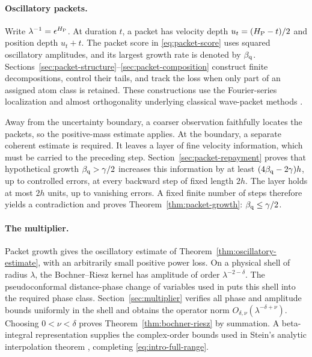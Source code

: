 \paragraph{Oscillatory packets.}
Write $\lambda^{-1}=\epsilon^{H_{\mathrm P}}$. At duration $t$, a packet has
velocity depth $u_t=(H_{\mathrm P}-t)/2$ and position depth $u_t+t$.
The packet score in \eqref{eq:packet-score} uses squared oscillatory
amplitudes, and its largest growth rate is denoted by $\beta_{\mathrm q}$.
Sections~\ref{sec:packet-structure}--\ref{sec:packet-composition}
construct finite decompositions, control their tails, and track the
loss when only part of an assigned atom class is retained. These
constructions use the Fourier-series localization and almost
orthogonality underlying classical wave-packet methods
\citep{Tao2003,GuoOhWangWuZhang2025}.

Away from the uncertainty boundary, a coarser observation faithfully
locates the packets, so the positive-mass estimate applies. At the
boundary, a separate coherent estimate is required. It leaves a layer
of fine velocity information, which must be carried to the preceding
step. Section~\ref{sec:packet-repayment} proves that hypothetical
growth $\beta_{\mathrm q}>\gamma/2$ increases this information by at least
$(4\beta_{\mathrm q}-2\gamma)h$, up to controlled errors, at every backward
step of fixed length $2h$. The layer holds at most $2h$ units, up to vanishing errors. A fixed
finite number of steps therefore yields a contradiction and proves
Theorem~\ref{thm:packet-growth}: $\beta_{\mathrm q}\le\gamma/2$.

\paragraph{The multiplier.}
Packet growth gives the oscillatory estimate of
Theorem~\ref{thm:oscillatory-estimate}, with an arbitrarily small
positive power loss. On a physical shell of radius $\lambda$, the
Bochner--Riesz kernel has amplitude of order $\lambda^{-2-\delta}$.
The pseudoconformal distance-phase change of variables used in
\citet{GuoOhWangWuZhang2025} puts this shell into the required phase
class. Section~\ref{sec:multiplier} verifies all phase and amplitude
bounds uniformly in the shell and obtains the operator norm
$O_{\delta,\nu}(\lambda^{-\delta+\nu})$. Choosing $0<\nu<\delta$
proves Theorem~\ref{thm:bochner-riesz} by summation. A beta-integral
representation supplies the complex-order bounds used in Stein's
analytic interpolation theorem \citep{Stein1956}, completing
\eqref{eq:intro-full-range}.

